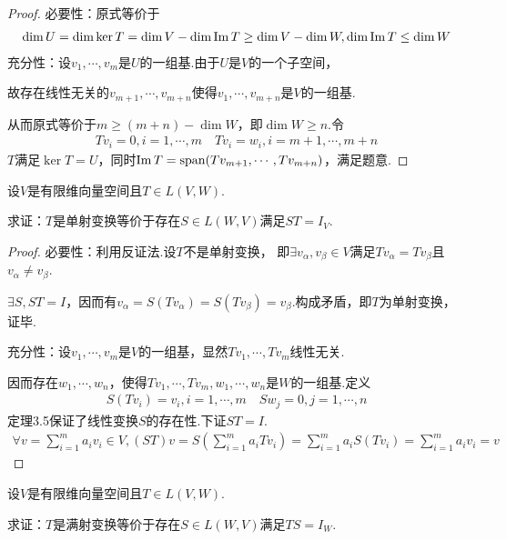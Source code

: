 \begin{proof}
    必要性：原式等价于
    \begin{align*}
        \dim U=\dim \ker T=\dim V-\dim \operatorname{Im} T \geq \dim V-\dim W,\dim \operatorname{Im} T \leq \dim W
    \end{align*}
    充分性：设\(v_1,\cdots,v_m\)是\(U\)的一组基.由于\(U\)是\(V\)的一个子空间，

    故存在线性无关的\(v_{m+1},\cdots,v_{m+n}\)使得\(v_1,\cdots,v_{m+n}\)是\(V\)的一组基.

    从而原式等价于\(m\geq (m+n)-\dim W\)，即\(\dim W\geq n\).令
    \begin{align*}
        Tv_i=0,i=1,\cdots,m \quad Tv_i=w_i,i=m+1,\cdots,m+n
    \end{align*}
    \(T\)满足\(\ker T=U\)，同时\(\operatorname{Im} T=\operatorname{span} (Tv_{m+1},\cdots,Tv_{m+n})\)，满足题意.
\end{proof}

\begin{problem}[20]\label{3.B.20}
    设\(V\)是有限维向量空间且\(T\in L(V,W)\).

    求证：\(T\)是单射变换等价于存在\(S \in L(W,V)\)满足\(ST=I_V\).
\end{problem}

\begin{proof}
    必要性：利用反证法.设\(T\)不是单射变换，
    即\(\exists v_\alpha,v_\beta \in V\)满足\(Tv_\alpha=Tv_\beta\)且\(v_\alpha \ne v_\beta\).
    
    \(\exists S,ST=I\)，因而有\(v_\alpha=S(Tv_\alpha)=S(Tv_\beta)=v_\beta\).构成矛盾，即\(T\)为单射变换，证毕.
    
    充分性：设\(v_1,\cdots,v_m\)是\(V\)的一组基，显然\(Tv_1,\cdots,Tv_m\)线性无关.
    
    因而存在\(w_1,\cdots,w_n\)，使得\(Tv_1,\cdots,Tv_m,w_1,\cdots,w_n\)是\(W\)的一组基.定义
    \begin{align*}
        S(Tv_i)=v_i,i=1,\cdots,m \quad Sw_j=0,j=1,\cdots,n
    \end{align*}
    定理3.5保证了线性变换\(S\)的存在性.下证\(ST=I\).
    \begin{align*}
        \forall v=\sum_{i=1}^m a_iv_i\in V,(ST)v=S(\sum_{i=1}^m a_iTv_i)
        =\sum_{i=1}^m a_iS(Tv_i)=\sum_{i=1}^m a_iv_i=v
    \end{align*}
\end{proof}

\newpage

\begin{problem}[21]\label{3.B.21}
    设\(V\)是有限维向量空间且\(T\in L(V,W)\).

    求证：\(T\)是满射变换等价于存在\(S\in L(W,V)\)满足\(TS=I_W\).    
\end{problem}

